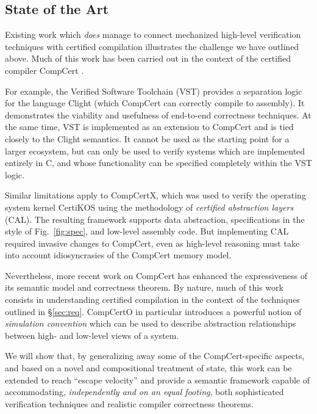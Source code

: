 \documentclass[acmsmall,screen,review,anonymous]{acmart}
\begin{document}
\subsection{State of the Art} %

Existing work which \emph{does} manage
to connect mechanized high-level verification techniques with
certified compilation
illustrates the challenge we have outlined above.
Much of this work has been carried out in the context of
the certified compiler CompCert \citep{compcert}.

For example,
the Verified Software Toolchain (VST) \citep{vst}
provides a separation logic for the language Clight
(which CompCert can correctly compile to assembly).
It demonstrates
the viability and usefulness of end-to-end correctness techniques.
At the same time,
VST is implemented as an extension to CompCert
and is tied closely to the Clight semantics.
It cannot be used as the starting point for a larger ecosystem,
but can only be used to verify systems
which are implemented entirely in C,
and whose functionality
can be specified completely within the VST logic.

Similar limitations apply to CompCertX,
which was used to verify the operating system kernel CertiKOS \citep{popl15}
using the methodology of \emph{certified abstraction layers} (CAL).
The resulting framework supports data abstraction,
specifications in the style of Fig.~\ref{fig:spec},
and low-level assembly code.
But implementing CAL required invasive changes to CompCert,
even as high-level reasoning must
take into account idiosyncrasies of the CompCert memory model.

Nevertheless,
more recent work on CompCert
has enhanced the expressiveness of its semantic model
and correctness theorem.
By nature,
much of this work consists in understanding certified compilation
in the context of the techniques outlined in \S\ref{sec:req}.
CompCertO \citep{compcerto} in particular
introduces a powerful notion of \emph{simulation convention}
which can be used to describe abstraction relationships
between high- and low-level views of a system.

We will show that,
by generalizing away some of the CompCert-specific aspects,
and based on a novel and compositional treatment of state,
this work can be extended to reach ``escape velocity''
and provide a semantic framework capable of accommodating,
\emph{independently and on an equal footing},
both sophisticated verification techniques
and realistic compiler correctness theorems.
\end{document}
